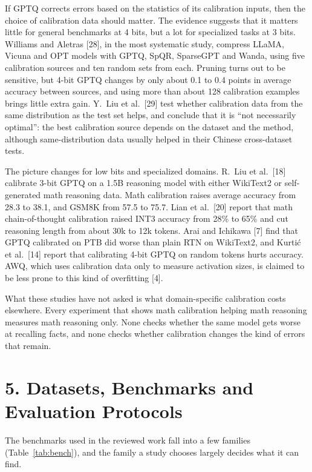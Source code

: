 \documentclass[10pt,twocolumn]{article}
\begin{document}
If GPTQ corrects errors based on the statistics of its calibration
inputs, then the choice of calibration data should matter. The evidence
suggests that it matters little for general benchmarks at 4 bits, but a
lot for specialized tasks at 3 bits. Williams and Aletras [28], in the
most systematic study, compress LLaMA, Vicuna and OPT models with GPTQ,
SpQR, SparseGPT and Wanda, using five calibration sources and ten random
sets from each. Pruning turns out to be sensitive, but 4-bit GPTQ
changes by only about 0.1 to 0.4 points in average accuracy between
sources, and using more than about 128 calibration examples brings
little extra gain. Y.~Liu et al.~[29] test whether calibration data from
the same distribution as the test set helps, and conclude that it is
``not necessarily optimal'': the best calibration source depends on the
dataset and the method, although same-distribution data usually helped
in their Chinese cross-dataset tests.

The picture changes for low bits and specialized domains. R.~Liu et
al.~[18] calibrate 3-bit GPTQ on a 1.5B reasoning model with either
WikiText2 or self-generated math reasoning data. Math calibration raises
average accuracy from 28.3 to 38.1, and GSM8K from 57.5 to 75.7. Lian et
al.~[20] report that math chain-of-thought calibration raised INT3
accuracy from 28\% to 65\% and cut reasoning length from about 30k to
12k tokens. Arai and Ichikawa [7] find that GPTQ calibrated on PTB did
worse than plain RTN on WikiText2, and Kurtić et al.~[14] report that
calibrating 4-bit GPTQ on random tokens hurts accuracy. AWQ, which uses
calibration data only to measure activation sizes, is claimed to be less
prone to this kind of overfitting [4].

What these studies have not asked is what domain-specific calibration
costs elsewhere. Every experiment that shows math calibration helping
math reasoning measures math reasoning only. None checks whether the
same model gets worse at recalling facts, and none checks whether
calibration changes the kind of errors that remain.

\section{5. Datasets, Benchmarks and Evaluation Protocols}

The benchmarks used in the reviewed work fall into a few families
(Table~\ref{tab:bench}), and the family a study chooses largely decides
what it can find.
\end{document}

